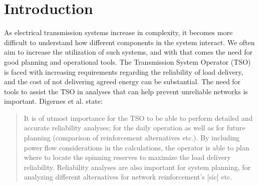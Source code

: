\documentclass[a4paper,12pt]{report}
\begin{document}
\setcounter{page}{3}
\tableofcontents
\newpage

\chapter{Introduction}
\label{ch:intro}
As electrical transmission systems increase in complexity, it becomes
more difficult to understand how different components in the system interact.
We often aim to increase the utilization of such systems, and with that comes
the need for good planning and operational tools.
The Transmission System Operator (TSO) is faced
with increasing requirements regarding the reliability of load
delivery, and the cost of not delivering agreed energy can be
substantial.
The need for tools to assist the TSO in analyses that can help prevent
unreliable networks is important.
Digernes et al. \cite{digernes} state:
\begin{quote}
It is of utmost importance for the TSO to be able to perform detailed and
accurate reliability analyses; for the daily operation as well as for
future planning (comparison of reinforcement alternatives etc.). By
including power flow considerations in the calculations, the operator is
able to plan where to locate the spinning reserves to maximize the load
delivery reliability. Reliability analyses are also important for system
planning, for analyzing different alternatives for network reinforcement's
[sic] etc.\cite{digernes}
\end{quote}
\end{document}
